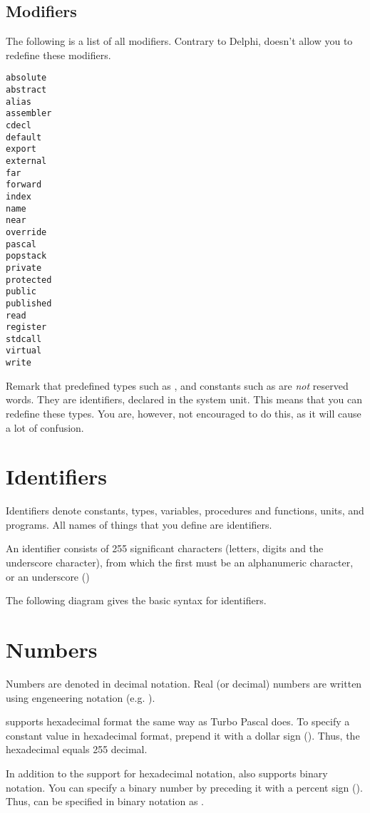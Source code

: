 \documentclass{report}
\begin{document}
\subsection{Modifiers}
The following is a list of all modifiers. Contrary to Delphi, \fpc doesn't
allow you to redefine these modifiers.
\begin{verbatim}
absolute
abstract
alias
assembler
cdecl
default
export
external
far
forward
index
name
near
override
pascal
popstack
private
protected
public
published
read
register
stdcall
virtual
write
\end{verbatim}
\latex{\end{multicols}}
Remark that predefined types such as ,  and constants
such as  are {\em not} reserved words. They are
identifiers, declared in the system unit. This means that you can redefine
these types. You are, however, not encouraged to do this, as it will cause 
a lot of confusion.

\section{Identifiers}

Identifiers denote constants, types, variables, procedures and functions,
units, and programs. All names of things that you define are identifiers.

An identifier consists of 255 significant characters (letters, digits and
the underscore character), from which the first must be an alphanumeric 
character, or an underscore (\var{\_})

The following diagram gives the basic syntax for identifiers.



\section{Numbers}
Numbers are denoted in decimal notation. Real (or decimal) numbers are
written using engeneering notation (e.g. ).

\fpc supports hexadecimal format the same way as Turbo Pascal does. To
specify a constant value in hexadecimal format, prepend it with a dollar
sign (\var{\$}). Thus, the hexadecimal  equals 255 decimal.

In addition to the support for hexadecimal notation, \fpc also supports
binary notation. You can specify a binary number by preceding it with a
percent sign (\var{\%}). Thus,  can be specified in binary notation
as .
\end{document}
